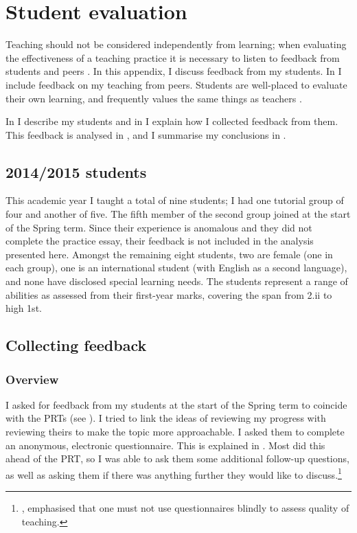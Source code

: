 \chapter{Student evaluation}\label{ap:student}

Teaching should not be considered independently from learning; when evaluating the effectiveness of a teaching practice it is necessary to listen to feedback from students and peers \citep[chapter 7]{Ramsden1992}. In this appendix, I discuss feedback from my students. In  I include feedback on my teaching from peers. Students are well-placed to evaluate their own learning, and frequently values the same things as teachers \citep[chapter 6]{Ramsden1992}.

In  I describe my students and in  I explain how I collected feedback from them. This feedback is analysed in , and I summarise my conclusions in .

\section{2014/2015 students}\label{sec:2014-15students}

This academic year I taught a total of nine students; I had one tutorial group of four and another of five. The fifth member of the second group joined at the start of the Spring term. Since their experience is anomalous and they did not complete the practice essay, their feedback is not included in the analysis presented here. Amongst the remaining eight students, two are female (one in each group), one is an international student (with English as a second language), and none have disclosed special learning needs. The students represent a range of abilities as assessed from their first-year marks, covering the span from 2.ii to high 1st.

\section{Collecting feedback}\label{sec:questions}

\subsection{Overview}

I asked for feedback from my students at the start of the Spring term to coincide with the PRTs (see ). I tried to link the ideas of reviewing my progress with reviewing theirs to make the topic more approachable. I asked them to complete an anonymous, electronic questionnaire. This is explained in . Most did this ahead of the PRT, so I was able to ask them some additional follow-up questions, as well as asking them if there was anything further they would like to discuss.\footnote{\citet[chapter 11]{Ramsden1992}, emphasised that one must not use questionnaires blindly to assess quality of teaching.}

